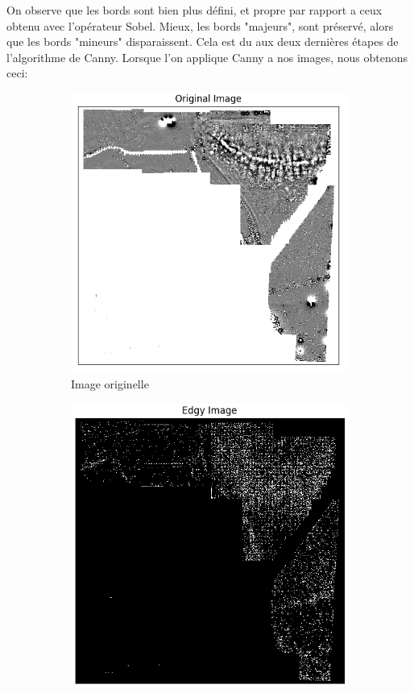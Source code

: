 \documentclass[a4paper, 12pt, titlepage, oneside, french]{article}
\begin{document}
	On observe que les bords sont bien plus défini, et propre par rapport a ceux obtenu avec l'opérateur Sobel. Mieux, les bords "majeurs", sont préservé, alors que les bords "mineurs" disparaissent. Cela est du aux deux dernières étapes de l'algorithme de Canny.
			Lorsque l'on applique Canny a nos images, nous obtenons ceci:
	\begin{figure}[!h]%
		\centering
		\begin{subfigure}[b]{0.4\linewidth}
			\includegraphics[width=\linewidth]{Canny1a.png}
			\caption{Image originelle}
		\end{subfigure}
		\begin{subfigure}[b]{0.4\linewidth}
			\includegraphics[width=\linewidth]{Canny1b.png}

\end{subfigure}
\end{figure}
\end{document}
